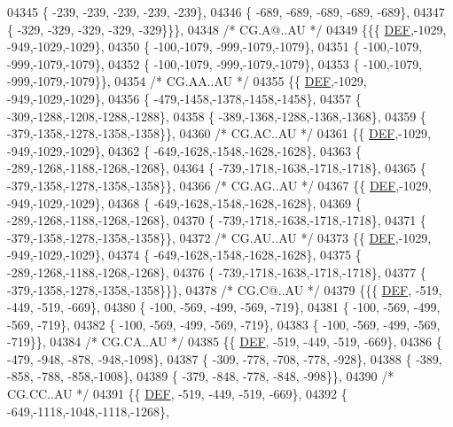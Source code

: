 \begin{DoxyCode}
04345 \{ -239, -239, -239, -239, -239\},
04346 \{ -689, -689, -689, -689, -689\},
04347 \{ -329, -329, -329, -329, -329\}\}\},
04348 \textcolor{comment}{/* CG.A@..AU */}
04349 \{\{\{  \mbox{\hyperlink{1_88_84__epars_8h_a397419fc12b37ed479c8abb9d444d843}{DEF}},-1029, -949,-1029,-1029\},
04350 \{ -100,-1079, -999,-1079,-1079\},
04351 \{ -100,-1079, -999,-1079,-1079\},
04352 \{ -100,-1079, -999,-1079,-1079\},
04353 \{ -100,-1079, -999,-1079,-1079\}\},
04354 \textcolor{comment}{/* CG.AA..AU */}
04355 \{\{  \mbox{\hyperlink{1_88_84__epars_8h_a397419fc12b37ed479c8abb9d444d843}{DEF}},-1029, -949,-1029,-1029\},
04356 \{ -479,-1458,-1378,-1458,-1458\},
04357 \{ -309,-1288,-1208,-1288,-1288\},
04358 \{ -389,-1368,-1288,-1368,-1368\},
04359 \{ -379,-1358,-1278,-1358,-1358\}\},
04360 \textcolor{comment}{/* CG.AC..AU */}
04361 \{\{  \mbox{\hyperlink{1_88_84__epars_8h_a397419fc12b37ed479c8abb9d444d843}{DEF}},-1029, -949,-1029,-1029\},
04362 \{ -649,-1628,-1548,-1628,-1628\},
04363 \{ -289,-1268,-1188,-1268,-1268\},
04364 \{ -739,-1718,-1638,-1718,-1718\},
04365 \{ -379,-1358,-1278,-1358,-1358\}\},
04366 \textcolor{comment}{/* CG.AG..AU */}
04367 \{\{  \mbox{\hyperlink{1_88_84__epars_8h_a397419fc12b37ed479c8abb9d444d843}{DEF}},-1029, -949,-1029,-1029\},
04368 \{ -649,-1628,-1548,-1628,-1628\},
04369 \{ -289,-1268,-1188,-1268,-1268\},
04370 \{ -739,-1718,-1638,-1718,-1718\},
04371 \{ -379,-1358,-1278,-1358,-1358\}\},
04372 \textcolor{comment}{/* CG.AU..AU */}
04373 \{\{  \mbox{\hyperlink{1_88_84__epars_8h_a397419fc12b37ed479c8abb9d444d843}{DEF}},-1029, -949,-1029,-1029\},
04374 \{ -649,-1628,-1548,-1628,-1628\},
04375 \{ -289,-1268,-1188,-1268,-1268\},
04376 \{ -739,-1718,-1638,-1718,-1718\},
04377 \{ -379,-1358,-1278,-1358,-1358\}\}\},
04378 \textcolor{comment}{/* CG.C@..AU */}
04379 \{\{\{  \mbox{\hyperlink{1_88_84__epars_8h_a397419fc12b37ed479c8abb9d444d843}{DEF}}, -519, -449, -519, -669\},
04380 \{ -100, -569, -499, -569, -719\},
04381 \{ -100, -569, -499, -569, -719\},
04382 \{ -100, -569, -499, -569, -719\},
04383 \{ -100, -569, -499, -569, -719\}\},
04384 \textcolor{comment}{/* CG.CA..AU */}
04385 \{\{  \mbox{\hyperlink{1_88_84__epars_8h_a397419fc12b37ed479c8abb9d444d843}{DEF}}, -519, -449, -519, -669\},
04386 \{ -479, -948, -878, -948,-1098\},
04387 \{ -309, -778, -708, -778, -928\},
04388 \{ -389, -858, -788, -858,-1008\},
04389 \{ -379, -848, -778, -848, -998\}\},
04390 \textcolor{comment}{/* CG.CC..AU */}
04391 \{\{  \mbox{\hyperlink{1_88_84__epars_8h_a397419fc12b37ed479c8abb9d444d843}{DEF}}, -519, -449, -519, -669\},
04392 \{ -649,-1118,-1048,-1118,-1268\},

\end{DoxyCode}
